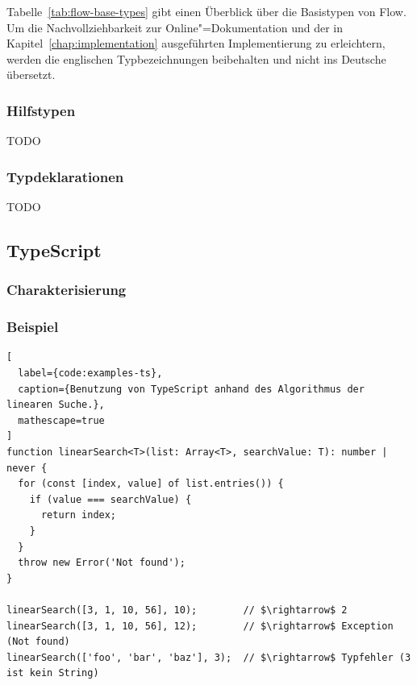 Tabelle~\ref{tab:flow-base-types} gibt einen Überblick über die Basistypen von Flow. Um die Nachvollziehbarkeit zur Online"=Dokumentation und der in Kapitel~\ref{chap:implementation} ausgeführten Implementierung zu erleichtern, werden die englischen Typbezeichnungen beibehalten und nicht ins Deutsche übersetzt.

\bigbreak


\subsubsection{Hilfstypen}
\label{subsec:flow:utility-types}

TODO

\bigbreak


\subsubsection{Typdeklarationen}
\label{subsubsec:type-declarations}

TODO

\bigbreak


\subsection{TypeScript}

\subsubsection{Charakterisierung}

\subsubsection{Beispiel}

\begin{lstlisting}[
  label={code:examples-ts},
  caption={Benutzung von TypeScript anhand des Algorithmus der linearen Suche.},
  mathescape=true
]
function linearSearch<T>(list: Array<T>, searchValue: T): number | never {
  for (const [index, value] of list.entries()) {
    if (value === searchValue) {
      return index;
    }
  }
  throw new Error('Not found');
}

linearSearch([3, 1, 10, 56], 10);        // $\rightarrow$ 2
linearSearch([3, 1, 10, 56], 12);        // $\rightarrow$ Exception (Not found)
linearSearch(['foo', 'bar', 'baz'], 3);  // $\rightarrow$ Typfehler (3 ist kein String)
\end{lstlisting}

